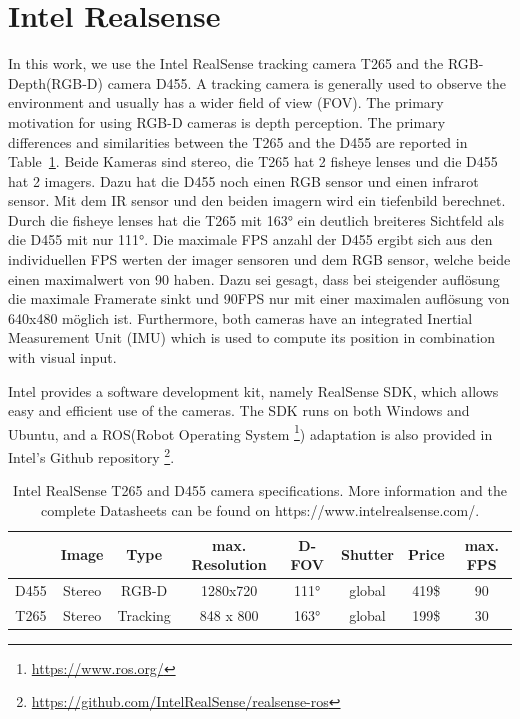 \documentclass[main.tex]{subfiles}
\begin{document}
\section{Intel Realsense}
In this work, we use the Intel RealSense tracking camera T265 and the RGB-Depth(RGB-D) camera D455.
A tracking camera is generally used to observe the environment and usually has a wider field of view (FOV). The primary motivation for using RGB-D cameras is depth perception.
The primary differences and similarities between the T265 and the D455 are reported in Table~\ref{tab:cameraspecs}.
Beide Kameras sind stereo, die T265 hat 2 fisheye lenses und die D455 hat 2 imagers. Dazu hat die D455 noch einen RGB sensor und einen infrarot sensor. Mit dem IR sensor und den beiden imagern wird ein tiefenbild berechnet.
Durch die fisheye lenses hat die T265 mit 163° ein deutlich breiteres Sichtfeld  als die D455 mit nur 111°. Die maximale FPS anzahl der D455 ergibt sich aus den individuellen FPS werten der imager sensoren und dem RGB sensor, welche beide einen maximalwert von 90 haben.
Dazu sei gesagt, dass bei steigender auflösung die maximale Framerate sinkt und 90FPS nur mit einer maximalen auflösung von 640x480 möglich ist.
Furthermore, both cameras have an integrated Inertial Measurement Unit (IMU) which is used to compute its position in combination with visual input.

Intel provides a software development kit, namely RealSense SDK, which allows easy and efficient use of the cameras.
The SDK runs on both Windows and Ubuntu, and a ROS(Robot Operating System \footnote{\href{https://www.ros.org/}{https://www.ros.org/}}) adaptation is also provided in Intel's Github repository \footnote{\href{https://github.com/IntelRealSense/realsense-ros}{https://github.com/IntelRealSense/realsense-ros}}.

\begin{table}[H]
    \centering
    \begin{tabular}{c|ccccccc}
             & Image  & Type     & max. Resolution & D-FOV & Shutter & Price & max. FPS \\ \hline
        D455 & Stereo & RGB-D    & 1280x720        & 111°  & global  & 419\$ & 90       \\ \hline
        T265 & Stereo & Tracking & 848 x 800       & 163°  & global  & 199\$ & 30
    \end{tabular}
    \caption[Intel RealSense T265 & D455 Specification]{Intel RealSense T265 and D455 camera specifications. More information and the complete Datasheets can be found on https://www.intelrealsense.com/.}
    \label{tab:cameraspecs}
\end{table}
\end{document}
